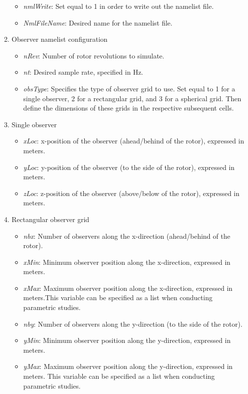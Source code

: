 \documentclass[journal ]{new-aiaa}
\begin{document}
\begin{enumerate}
\begin{itemize}
\item \textit{nmlWrite}: Set equal to 1 in order to write out the namelist file. 
\item \textit{NmlFileName}: Desired name for the namelist file. 
\end{itemize}
\item Observer namelist configuration 
\begin{itemize}
\item \textit{nRev}: Number of rotor revolutions to simulate.
\item \textit{nt}: Desired sample rate, specified in Hz. 
\item \textit{obsType}: Specifies the type of observer grid to use. Set equal to 1 for a single observer, 2 for a rectangular grid, and 3 for a spherical grid. Then define the dimensions of these grids in the respective subsequent cells. 
\end{itemize}
\item Single observer 
\begin{itemize}
\item \textit{xLoc}: x-position of the observer (ahead/behind of the rotor), expressed in meters.
\item \textit{yLoc}: y-position of the observer (to the side of the rotor), expressed in meters.
\item \textit{zLoc}: z-position of the observer (above/below of the rotor), expressed in meters.
\end{itemize}
\item Rectangular observer grid
\begin{itemize}
\item \textit{nbx}: Number of observers along the x-direction (ahead/behind of the rotor).
\item \textit{xMin}: Minimum observer position along the x-direction, expressed in meters. 
\item \textit{xMax}: Maximum observer position along the x-direction, expressed in meters.This variable can be specified as a list when conducting parametric studies. 
\item \textit{nby}: Number of observers along the y-direction (to the side of the rotor).
\item \textit{yMin}: Minimum observer position along the y-direction, expressed in meters.
\item \textit{yMax}: Maximum observer position along the y-direction, expressed in meters. This variable can be specified as a list when conducting parametric studies. 

\end{itemize}
\end{enumerate}
\end{document}
